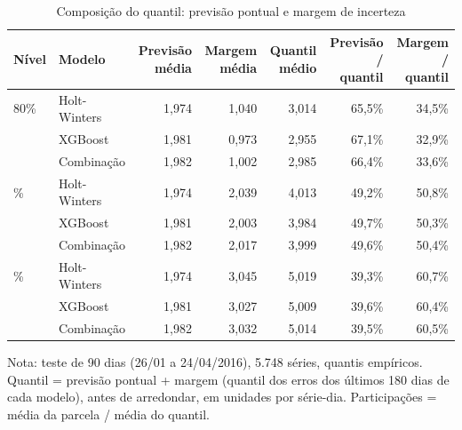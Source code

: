 \begin{table}[htbp]
\centering
\small
\caption{Composição do quantil: previsão pontual e margem de incerteza}
\label{tab:comp_composicao_quantil}
\begin{tabular}{llrrrrr}
\toprule
Nível & Modelo & Previsão média & Margem média & Quantil médio & Previsão / quantil & Margem / quantil \\
\midrule
80\% & Holt-Winters & 1,974 & 1,040 & 3,014 & 65,5\% & 34,5\% \\
 & XGBoost & 1,981 & 0,973 & 2,955 & 67,1\% & 32,9\% \\
 & Combinação & 1,982 & 1,002 & 2,985 & 66,4\% & 33,6\% \\
\addlinespace
90\% & Holt-Winters & 1,974 & 2,039 & 4,013 & 49,2\% & 50,8\% \\
 & XGBoost & 1,981 & 2,003 & 3,984 & 49,7\% & 50,3\% \\
 & Combinação & 1,982 & 2,017 & 3,999 & 49,6\% & 50,4\% \\
\addlinespace
95\% & Holt-Winters & 1,974 & 3,045 & 5,019 & 39,3\% & 60,7\% \\
 & XGBoost & 1,981 & 3,027 & 5,009 & 39,6\% & 60,4\% \\
 & Combinação & 1,982 & 3,032 & 5,014 & 39,5\% & 60,5\% \\
\bottomrule
\end{tabular}
\par\smallskip
{\footnotesize Nota: teste de 90 dias (26/01 a 24/04/2016), 5.748 séries, quantis empíricos. Quantil = previsão pontual + margem (quantil dos erros dos últimos 180 dias de cada modelo), antes de arredondar, em unidades por série-dia. Participações = média da parcela / média do quantil.}
\end{table}

